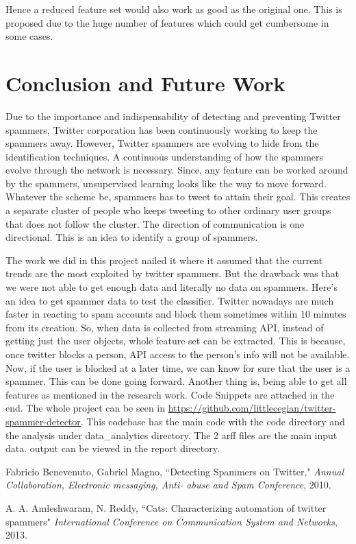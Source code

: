 \documentclass[11pt]{article}
\begin{document}
Hence a reduced feature set would also work as good as the original one. This is proposed due to the huge number of features which could get cumbersome in some cases. 

\section{Conclusion and Future Work}

Due to the importance and indispensability of detecting and preventing Twitter spammers, Twitter corporation has been continuously working to keep the spammers away. However, Twitter spammers are evolving to hide from the identification techniques. A continuous understanding of how the spammers evolve through the network is necessary. Since, any feature can be worked around by the spammers, unsupervised learning looks like the way to move forward. Whatever the scheme be, spammers has to tweet to attain their goal.
This creates a separate cluster of people who keeps tweeting to other ordinary user groups that does not follow the cluster. The direction of communication is one directional. This is an idea to identify a group of spammers.

The work we did in this project nailed it where it assumed that the current trends are the most exploited by twitter spammers. But the drawback was that we were not able to get enough data and literally no data on spammers.
Here's an idea to get spammer data to test the classifier. Twitter nowadays are much faster in reacting to spam accounts and block them sometimes within 10 minutes from its creation. So, when data is collected from streaming API, instead of getting just the user objects, whole feature set can be extracted. This is because, once twitter blocks a person, API access to the person's info will not be available. Now, if the user is blocked at a later time, we can know for sure that the user is a spammer. This can be done going forward. Another thing is, being able to get all features as mentioned in the research work. Code Snippets are attached in the end. The whole project can be seen in \url{https://github.com/littlecegian/twitter-spammer-detector}. This codebase has the main code with the code directory and the analysis under data\_analytics directory. The 2 arff files are the main input data. output can be viewed in the report directory.

\begin{thebibliography}{99}


Fabricio Benevenuto, Gabriel Magno, ``Detecting Spammers on Twitter," \emph{Annual Collaboration, Electronic messaging, Anti-
abuse and Spam Conference}, 2010.

A. A. Amleshwaram, N. Reddy, ``Cats:
Characterizing automation of twitter spammers" \emph{International Conference on Communication System and Networks}, 2013.

\end{thebibliography}
\end{document}

